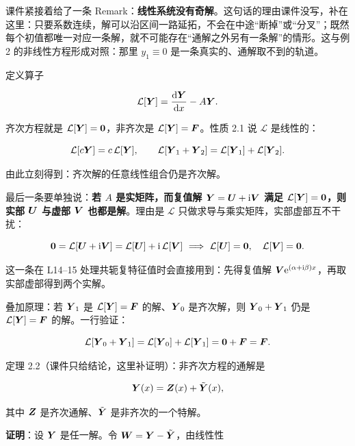 \documentclass[11pt]{ctexart}
\begin{document}
课件紧接着给了一条 Remark：\textbf{线性系统没有奇解}。这句话的理由课件没写，补在这里：只要系数连续，解可以沿区间一路延拓，不会在中途“断掉”或“分叉”；既然每个初值都唯一对应一条解，就不可能存在“通解之外另有一条解”的情形。这与例 2 的非线性方程形成对照：那里 $y_1\equiv0$ 是一条真实的、通解取不到的轨道。


定义算子

\[
\mathcal{L}[\boldsymbol{Y}]=\frac{\mathrm{d}\boldsymbol{Y}}{\mathrm{d}x}-A\boldsymbol{Y}.
\]

齐次方程就是 $\mathcal{L}[\boldsymbol{Y}]=\boldsymbol{0}$，非齐次是 $\mathcal{L}[\boldsymbol{Y}]=\boldsymbol{F}$。性质 2.1 说 $\mathcal{L}$ 是线性的：

\[
\mathcal{L}[c\boldsymbol{Y}]=c\,\mathcal{L}[\boldsymbol{Y}],\qquad
\mathcal{L}[\boldsymbol{Y}_1+\boldsymbol{Y}_2]=\mathcal{L}[\boldsymbol{Y}_1]+\mathcal{L}[\boldsymbol{Y}_2].
\]

由此立刻得到：齐次解的任意线性组合仍是齐次解。

最后一条要单独说：\textbf{若 $A$ 是实矩阵，而复值解 $\boldsymbol{Y}=\boldsymbol{U}+\mathrm{i}\boldsymbol{V}$ 满足 $\mathcal{L}[\boldsymbol{Y}]=\boldsymbol{0}$，则实部 $\boldsymbol{U}$ 与虚部 $\boldsymbol{V}$ 也都是解}。理由是 $\mathcal{L}$ 只做求导与乘实矩阵，实部虚部互不干扰：

\[
\boldsymbol{0}=\mathcal{L}[\boldsymbol{U}+\mathrm{i}\boldsymbol{V}]=\mathcal{L}[\boldsymbol{U}]+\mathrm{i}\,\mathcal{L}[\boldsymbol{V}]
\ \Longrightarrow\
\mathcal{L}[\boldsymbol{U}]=\boldsymbol{0},\quad \mathcal{L}[\boldsymbol{V}]=\boldsymbol{0}.
\]

这一条在 L14--15 处理共轭复特征值时会直接用到：先得复值解 $\boldsymbol{V}\mathrm{e}^{(\alpha+\mathrm{i}\beta)x}$，再取实部虚部得到两个实解。


叠加原理：若 $\boldsymbol{Y}_1$ 是 $\mathcal{L}[\boldsymbol{Y}]=\boldsymbol{F}$ 的解、$\boldsymbol{Y}_0$ 是齐次解，则 $\boldsymbol{Y}_0+\boldsymbol{Y}_1$ 仍是 $\mathcal{L}[\boldsymbol{Y}]=\boldsymbol{F}$ 的解。一行验证：

\[
\mathcal{L}[\boldsymbol{Y}_0+\boldsymbol{Y}_1]=\mathcal{L}[\boldsymbol{Y}_0]+\mathcal{L}[\boldsymbol{Y}_1]=\boldsymbol{0}+\boldsymbol{F}=\boldsymbol{F}.
\]

定理 2.2（课件只给结论，这里补证明）：非齐次方程的通解是

\[
\boldsymbol{Y}(x)=\boldsymbol{Z}(x)+\tilde{\boldsymbol{Y}}(x),
\]

其中 $\boldsymbol{Z}$ 是齐次通解、$\tilde{\boldsymbol{Y}}$ 是非齐次的一个特解。

\textbf{证明}：设 $\boldsymbol{Y}$ 是任一解。令 $\boldsymbol{W}=\boldsymbol{Y}-\tilde{\boldsymbol{Y}}$，由线性性
\end{document}
